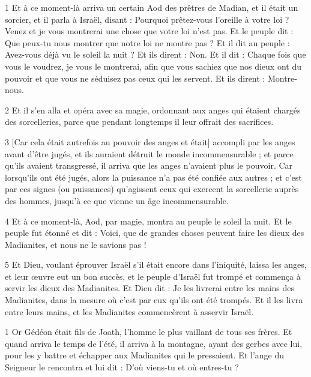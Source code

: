 
\par 1 Et à ce moment-là arriva un certain Aod des prêtres de Madian, et il était un sorcier, et il parla à Israël, disant : Pourquoi prêtez-vous l'oreille à votre loi ? Venez et je vous montrerai une chose que votre loi n'est pas. Et le peuple dit : Que peux-tu nous montrer que notre loi ne montre pas ? Et il dit au peuple : Avez-vous déjà vu le soleil la nuit ? Et ils dirent : Non. Et il dit : Chaque fois que vous le voudrez, je vous le montrerai, afin que vous sachiez que nos dieux ont du pouvoir et que vous ne séduisez pas ceux qui les servent. Et ils dirent : Montre-nous.

\par 2 Et il s'en alla et opéra avec sa magie, ordonnant aux anges qui étaient chargés des sorcelleries, parce que pendant longtemps il leur offrait des sacrifices.

\par 3 [Car cela était autrefois au pouvoir des anges et était] accompli par les anges avant d'être jugés, et ils auraient détruit le monde incommensurable ; et parce qu'ils avaient transgressé, il arriva que les anges n'avaient plus le pouvoir. Car lorsqu'ils ont été jugés, alors la puissance n'a pas été confiée aux autres ; et c'est par ces signes (ou puissances) qu'agissent ceux qui exercent la sorcellerie auprès des hommes, jusqu'à ce que vienne un âge incommensurable.

\par 4 Et à ce moment-là, Aod, par magie, montra au peuple le soleil la nuit. Et le peuple fut étonné et dit : Voici, que de grandes choses peuvent faire les dieux des Madianites, et nous ne le savions pas !

\par 5 Et Dieu, voulant éprouver Israël s'il était encore dans l'iniquité, laissa les anges, et leur œuvre eut un bon succès, et le peuple d'Israël fut trompé et commença à servir les dieux des Madianites. Et Dieu dit : Je les livrerai entre les mains des Madianites, dans la mesure où c'est par eux qu'ils ont été trompés. Et il les livra entre leurs mains, et les Madianites commencèrent à asservir Israël.


\par 1 Or Gédéon était fils de Joath, l'homme le plus vaillant de tous ses frères. Et quand arriva le temps de l'été, il arriva à la montagne, ayant des gerbes avec lui, pour les y battre et échapper aux Madianites qui le pressaient. Et l'ange du Seigneur le rencontra et lui dit : D'où viens-tu et où entres-tu ?

